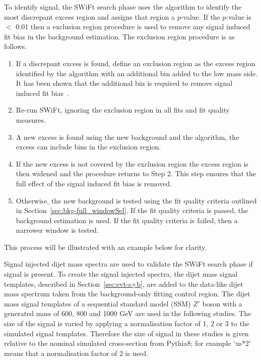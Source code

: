 To identify signal, the SWiFt search phase uses the \bh{} algorithm to identify the most discrepant excess region and assigns that region a \mbox{$p$-value}.
If the \mbox{$p$-value} is $<$ 0.01 then a exclusion region procedure is used to remove any signal induced fit bias in the background estimation.
The exclusion region procedure is as follows.
\begin{enumerate}[leftmargin=*]
\item If a discrepant excess is found, define an exclusion region as the excess
  region identified by the \bh{} algorithm with an additional \mjj{} bin added to the low mass side.
  It has been shown that the additional bin is required to remove signal induced fit bias~\cite{dijet-mori16_paper}.
\item Re-run SWiFt, ignoring the exclusion region in all fits and fit quality measures.
\item A new excess is found using the new background and the \bh{} algorithm,
  the excess can include bins in the exclusion region.
\item If the new excess is not covered by the exclusion region the excess region is then widened and the procedure returns to Step 2.
  This step ensures that the full effect of the signal induced fit bias is removed.
\item Otherwise, the new background is tested using the fit quality criteria outlined in Section~\ref{sec:bkg-full_windowSel}.
  If the fit quality criteria is passed, the background estimation is used.
  If the fit quality criteria is failed, then a narrower window is tested.
\end{enumerate}
This process will be illustrated with an example below for clarity.

Signal injected dijet mass spectra are used to validate the SWiFt search phase if signal is present.
To create the signal injected spectra, the dijet mass signal templates, described in Section~\ref{sec:evt-s+b},
are added to the data-like dijet mass spectrum taken from the background-only fitting control region.
The dijet mass signal templates of a sequential standard model (SSM) $Z'$ boson with a generated mass of 600, 800 and 1000 GeV are used in the following studies.
The size of the signal is varied by applying a normalisation factor of 1, 2 or 3 to the simulated signal templates.
Therefore the size of signal in these studies is given relative to the nominal simulated cross-section from { \sc Pythia8};
for example `xs*2' means that a normalisation factor of 2 is used.

